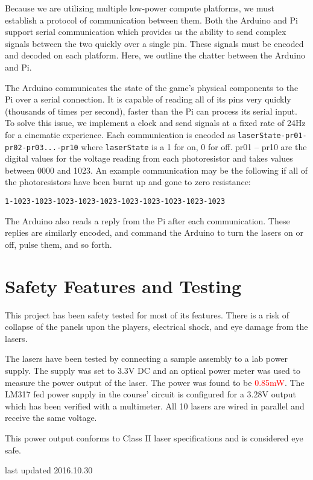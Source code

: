 \documentclass[11pt,oneside,final,letterpaper]{memoir}
\begin{document}
Because we are utilizing multiple low-power compute platforms, we must establish a protocol of communication between them.  Both the Arduino and Pi support serial communication which provides us the ability to send complex signals between the two quickly over a single pin.  These signals must be encoded and decoded on each platform.  Here, we outline the chatter between the Arduino and Pi.

The Arduino communicates the state of the game's physical components to the Pi over a serial connection.  It is capable of reading all of its pins very quickly (thousands of times per second), faster than the Pi can process its serial input.  To solve this issue, we implement a clock and send signals at a fixed rate of 24Hz for a cinematic experience.  Each communication is encoded as \texttt{laserState-pr01-pr02-pr03...-pr10} where \texttt{laserState} is a 1 for on, 0 for off.  pr01 -- pr10 are the digital values for the voltage reading from each photoresistor and takes values between 0000 and 1023.  An example communication may be the following if all of the photoresistors have been burnt up and gone to zero resistance:

\begin{center}
\texttt{1-1023-1023-1023-1023-1023-1023-1023-1023-1023-1023}
\end{center}

The Arduino also reads a reply from the Pi after each communication.  These replies are similarly encoded, and command the Arduino to turn the lasers on or off, pulse them, and so forth.


\chapter*{Safety Features and Testing}

This project has been safety tested for most of its features.  There is a risk of collapse of the panels upon the players, electrical shock, and eye damage from the lasers.  

The lasers have been tested by connecting a sample assembly to a lab power supply.  The supply was set to 3.3V DC and an optical power meter was used to measure the power output of the laser.  The power was found to be \textcolor{red}{0.85mW}.  The LM317 fed power supply in the course' circuit is configured for a 3.28V output which has been verified with a multimeter.  All 10 lasers are wired in parallel and receive the same voltage.

This power output conforms to Class II laser specifications and is considered eye safe.

\vspace*{\fill}
\begin{flushright}
last updated 2016.10.30
\end{flushright}
\end{document}
